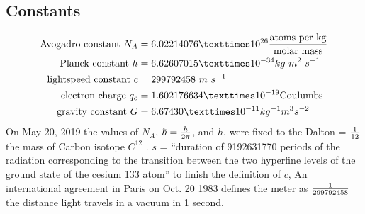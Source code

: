 \begin{multicols}{2}

\section{Constants} %
\begin{align*}
\text{Avogadro constant } N_A&=6.02214076×10^{26} {\text{atoms per kg} \over \text{molar mass}}\\
\text{Planck constant } h&= 6.62607015 × 10^{-34} kg~m^2~ s^{-1}\\
\text{lightspeed constant } c&=299792458 ~m~s^{-1}\\
\text{electron charge }q_e&=1.602176634 × 10^{-19} \text{Coulumbs}\\
\text{gravity constant }G&=6.674 30 × 10^{-11}kg^{-1} m^3 s^{-2}
\end{align*}
On May 20, 2019 the values of $N_A$, $\hbar ={{h} \over {2\pi }} $, and $h$, were fixed to the Dalton = ${1 \over 12}$ the mass of Carbon isotope $C^{12}$  \citep{Horst1}. 
$s$ = ``duration of 9192631770 periods of the radiation corresponding to the transition between the two hyperfine levels of the ground state of the cesium 133 atom''\citep{CGPM13} %
to finish the definition of $c$, An international agreement in Paris on Oct. 20 1983 defines the meter as $1\over 299792458$ the distance light travels in a vacuum in 1 second\citep{newspaper_1983}, %


\end{multicols}
